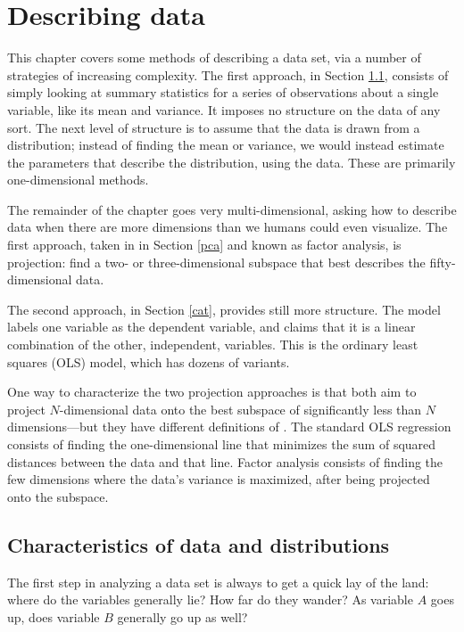 \chapter{Describing data} \label{projections}

This chapter covers some methods of describing a data set, via a
number of strategies of increasing complexity. 
The first approach, in Section \ref{basicstats}, consists of simply looking
at summary statistics for a series of observations about a single
variable, like its mean and variance. It imposes no structure on the
data of any sort. The next level of structure is to
assume that the data is drawn from a distribution; instead of finding
the mean or variance, we would instead estimate the parameters that
describe the distribution, using the data. These are primarily
one-dimensional methods.

The remainder of the chapter goes very multi-dimensional, asking how
to describe data when there are more dimensions than we humans could
even visualize. The first approach, taken in in Section \ref{pca} and
known as factor analysis,
is projection: find a two- or three-dimensional subspace that best
describes the fifty-dimensional data. 

The second approach, in Section \ref{cat}, provides still more
structure. The model labels one variable as the dependent variable, and claims
that it is a linear combination of the other, independent, variables.
This is the ordinary least squares (OLS) model, which has dozens of variants.

One way to characterize the two projection approaches is that both
aim to project $N$-di\-men\-sion\-al data onto the best subspace of
significantly less than $N$ di\-men\-sions---but they have different
definitions of .  The standard OLS  regression consists of finding the one-dimensional line
that minimizes the sum of squared distances between the data and that
line. Factor analysis consists of finding the few dimensions where the
data's variance is maximized, after being projected onto the subspace.


\section{Characteristics of data and distributions}\label{basicstats}
The first step in analyzing a data set is always to get a quick lay of
the land: where do the variables generally lie? How far do they wander?
As variable $A$ goes up, does variable $B$ generally go up as well?

